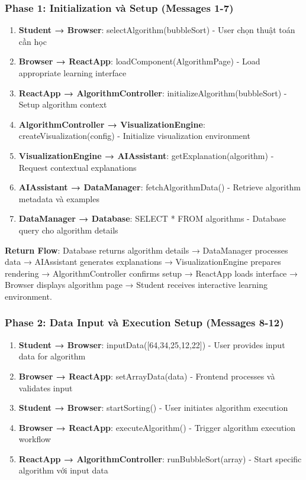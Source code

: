 \subsubsection{Phase 1: Initialization và Setup (Messages 1-7)}

\begin{enumerate}
    \item \textbf{Student → Browser}: selectAlgorithm(bubbleSort) - User chọn thuật toán cần học
    \item \textbf{Browser → ReactApp}: loadComponent(AlgorithmPage) - Load appropriate learning interface
    \item \textbf{ReactApp → AlgorithmController}: initializeAlgorithm(bubbleSort) - Setup algorithm context
    \item \textbf{AlgorithmController → VisualizationEngine}: createVisualization(config) - Initialize visualization environment
    \item \textbf{VisualizationEngine → AIAssistant}: getExplanation(algorithm) - Request contextual explanations
    \item \textbf{AIAssistant → DataManager}: fetchAlgorithmData() - Retrieve algorithm metadata và examples
    \item \textbf{DataManager → Database}: SELECT * FROM algorithms - Database query cho algorithm details
\end{enumerate}

\textbf{Return Flow}: Database returns algorithm details → DataManager processes data → AIAssistant generates explanations → VisualizationEngine prepares rendering → AlgorithmController confirms setup → ReactApp loads interface → Browser displays algorithm page → Student receives interactive learning environment.

\subsubsection{Phase 2: Data Input và Execution Setup (Messages 8-12)}

\begin{enumerate}
    \item \textbf{Student → Browser}: inputData([64,34,25,12,22]) - User provides input data for algorithm
    \item \textbf{Browser → ReactApp}: setArrayData(data) - Frontend processes và validates input
    \item \textbf{Student → Browser}: startSorting() - User initiates algorithm execution
    \item \textbf{Browser → ReactApp}: executeAlgorithm() - Trigger algorithm execution workflow
    \item \textbf{ReactApp → AlgorithmController}: runBubbleSort(array) - Start specific algorithm với input data
\end{enumerate}

